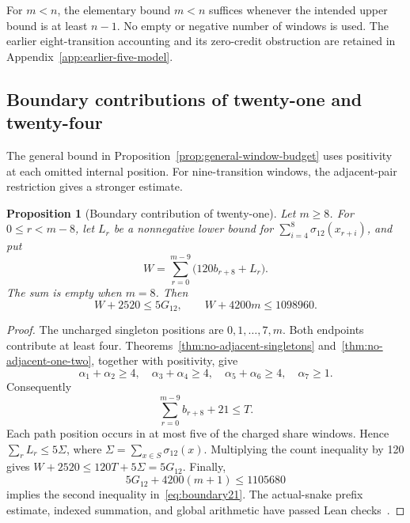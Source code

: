 \documentclass[11pt,a4paper]{article}
\newtheorem{proposition}[theorem]{Proposition}
\theoremstyle{definition}
\theoremstyle{remark}
\begin{document}
For $m<n$, the elementary bound $m<n$ suffices whenever the intended upper bound is at least $n-1$. No empty or negative number of windows is used. The earlier eight-transition accounting and its zero-credit obstruction are retained in Appendix~\ref{app:earlier-five-model}.

\subsection{Boundary contributions of twenty-one and twenty-four}\label{sec:boundary21}
The general bound in Proposition~\ref{prop:general-window-budget} uses positivity at each omitted internal position. For nine-transition windows, the adjacent-pair restriction gives a stronger estimate.

\begin{proposition}[Boundary contribution of twenty-one]\label{prop:boundary21}
Let $m\ge8$. For $0\le r<m-8$, let $L_r$ be a nonnegative lower bound for
$\sum_{i=4}^{8}\sigma_{12}(x_{r+i})$, and put
\[
W=\sum_{r=0}^{m-9}\bigl(120b_{r+8}+L_r\bigr).
\]
The sum is empty when $m=8$. Then
\begin{equation}\label{eq:boundary21}
W+2520\le5G_{12},\qquad W+4200m\le1098960.
\end{equation}
\end{proposition}
\begin{proof}
The uncharged singleton positions are $0,1,\ldots,7,m$. Both endpoints contribute at least four. Theorems~\ref{thm:no-adjacent-singletons} and~\ref{thm:no-adjacent-one-two}, together with positivity, give
\[
\alpha_1+\alpha_2\ge4,\quad
\alpha_3+\alpha_4\ge4,\quad
\alpha_5+\alpha_6\ge4,\quad\alpha_7\ge1.
\]
Consequently
\[
\sum_{r=0}^{m-9}b_{r+8}+21\le T.
\]
Each path position occurs in at most five of the charged share windows. Hence $\sum_rL_r\le5\Sigma$, where $\Sigma=\sum_{x\in S}\sigma_{12}(x)$. Multiplying the count inequality by 120 gives $W+2520\le120T+5\Sigma=5G_{12}$. Finally,
\[
5G_{12}+4200(m+1)\le1105680
\]
implies the second inequality in~\eqref{eq:boundary21}. The actual-snake prefix estimate, indexed summation, and global arithmetic have passed Lean checks~\cite{boundaryarchive}.
\end{proof}
\end{document}
